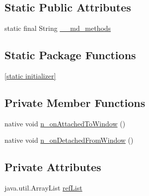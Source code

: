 \subsection*{Static Public Attributes}
\begin{CompactItemize}
\item 
static final String \hyperlink{classmd5b60ffeb829f638581ab2bb9b1a7f4f3f_1_1_tabbed_renderer_38151846bc49cd1f6a91896a729a40ec}{\_\-\_\-md\_\-methods}
\end{CompactItemize}
\subsection*{Static Package Functions}
\begin{CompactItemize}
\item 
\hyperlink{classmd5b60ffeb829f638581ab2bb9b1a7f4f3f_1_1_tabbed_renderer_78c75b6f8cd7f1a32fa26866647bb950}{\mbox{[}static initializer\mbox{]}}
\end{CompactItemize}
\subsection*{Private Member Functions}
\begin{CompactItemize}
\item 
native void \hyperlink{classmd5b60ffeb829f638581ab2bb9b1a7f4f3f_1_1_tabbed_renderer_c552558d45baca5c9e063a2a285e54e4}{n\_\-onAttachedToWindow} ()
\item 
native void \hyperlink{classmd5b60ffeb829f638581ab2bb9b1a7f4f3f_1_1_tabbed_renderer_8a43df8840c31f22c2e855fce9416b1b}{n\_\-onDetachedFromWindow} ()
\end{CompactItemize}
\subsection*{Private Attributes}
\begin{CompactItemize}
\item 
java.util.ArrayList \hyperlink{classmd5b60ffeb829f638581ab2bb9b1a7f4f3f_1_1_tabbed_renderer_475c98fea70c5eb38a89991a3bb04f77}{refList}
\end{CompactItemize}


